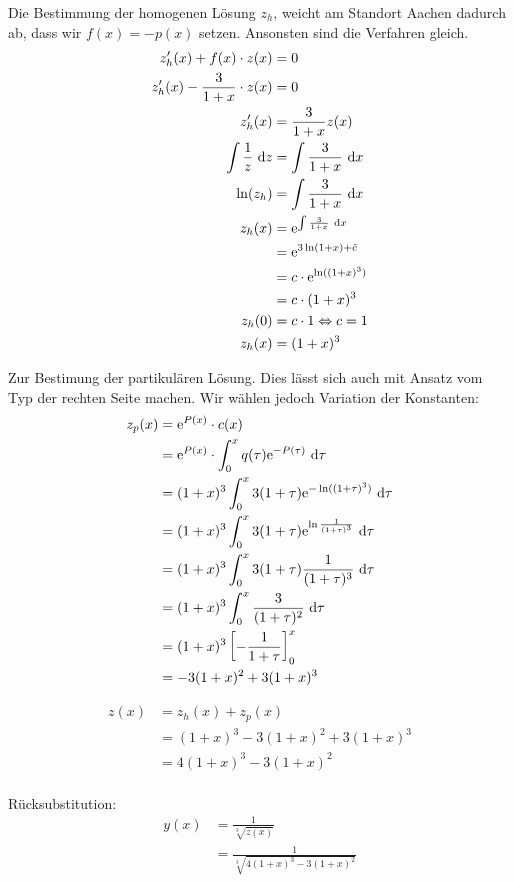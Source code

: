 \documentclass[main.tex]{subfiles}
\begin{document}
Die Bestimmung der homogenen Lösung $z_h$, weicht am Standort Aachen dadurch ab, dass wir $f(x) = -p(x)$ setzen. Ansonsten sind die Verfahren gleich. 
\begin{align*}
	z_h'(x) + f(x)\cdot z(x) &= 0 \\
	z_h'(x) - \frac{3}{1+x}\cdot z(x) &= 0 \\
	z_h'(x) &= \frac{3}{1+x} z(x) \\
	\int \frac{1}{z}~\mathrm{d}z &= \int \frac{3}{1+x} ~\mathrm{d}x \\
	\ln(z_h) &= \int \frac{3}{1+x} ~\mathrm{d}x\\
	z_h(x) &= \mathrm{e}^{\int \frac{3}{1+x}~\mathrm{d}x} \\
	  &= \mathrm{e}^{3\ln(1+x)+\tilde{c}}\\
	  &= c\cdot \mathrm{e}^{\ln((1+x)^3)}\\
	  &= c\cdot (1+x)^3 \\
	z_h(0) &= c\cdot 1 \Leftrightarrow c = 1 \\
	z_h(x) &= (1+x)^3
\end{align*}

Zur Bestimung der partikulären Lösung. Dies lässt sich auch mit Ansatz vom Typ der rechten Seite machen. Wir wählen jedoch Variation der Konstanten: 
\begin{align*}
	z_p(x) &= \mathrm{e}^{P(x)} \cdot c(x)\\
		   &= \mathrm{e}^{P(x)} \cdot \int_0^x q(\tau)\mathrm{e}^{-P(\tau)} ~\mathrm{d}\tau\\
		   &= (1+x)^3 \int_0^x 3(1+\tau) \mathrm{e}^{-\ln((1+\tau)^3)} ~\mathrm{d}\tau \\
		   &= (1+x)^3 \int_0^x 3(1+\tau) \mathrm{e}^{\ln\frac{1}{(1+\tau)^3}} ~\mathrm{d}\tau \\
		   &= (1+x)^3 \int_0^x 3(1+\tau) \frac{1}{(1+\tau)^3} ~\mathrm{d}\tau \\
		   &= (1+x)^3 \int_0^x \frac{3}{(1+\tau)^2} ~\mathrm{d}\tau \\
		   &= (1+x)^3 \left[ - \frac{1}{1+\tau} \right]_0^x \\
		   &= -3(1+x)^2 + 3(1+x)^3 \\
\end{align*}

\begin{align*}
	z(x) &= z_h(x) + z_p(x) \\
		 &= (1+x)^3 -3(1+x)^2 + 3(1+x)^3 \\
		 &= 4(1+x)^3 -3(1+x)^2 \\
\end{align*}

Rücksubstitution:
\begin{align*}
	y(x) &= \frac{1}{\sqrt[3]{z(x)}} \\
		 &= \frac{1}{\sqrt[3]{4(1+x)^3 -3(1+x)^2}}
\end{align*}
\end{document}
